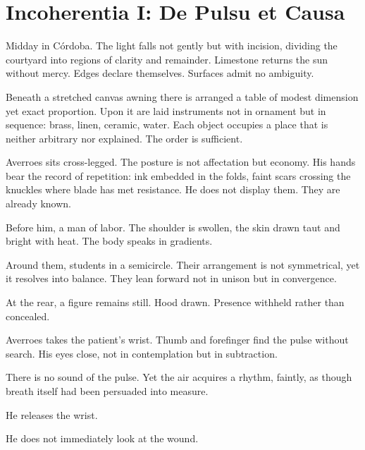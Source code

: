 
\chapter*{Incoherentia I: De Pulsu et Causa}


Midday in Córdoba. The light falls not gently but with incision, dividing
the courtyard into regions of clarity and remainder. Limestone returns the
sun without mercy. Edges declare themselves. Surfaces admit no ambiguity.

Beneath a stretched canvas awning there is arranged a table of modest
dimension yet exact proportion. Upon it are laid instruments not in ornament
but in sequence: brass, linen, ceramic, water. Each object occupies a place
that is neither arbitrary nor explained. The order is sufficient.

Averroes sits cross-legged. The posture is not affectation but economy. His
hands bear the record of repetition: ink embedded in the folds, faint scars
crossing the knuckles where blade has met resistance. He does not display
them. They are already known.

Before him, a man of labor. The shoulder is swollen, the skin drawn taut
and bright with heat. The body speaks in gradients.

Around them, students in a semicircle. Their arrangement is not symmetrical,
yet it resolves into balance. They lean forward not in unison but in
convergence.

At the rear, a figure remains still. Hood drawn. Presence withheld rather
than concealed.

Averroes takes the patient's wrist. Thumb and forefinger find the pulse
without search. His eyes close, not in contemplation but in subtraction.

There is no sound of the pulse. Yet the air acquires a rhythm, faintly,
as though breath itself had been persuaded into measure.

He releases the wrist.

He does not immediately look at the wound.

